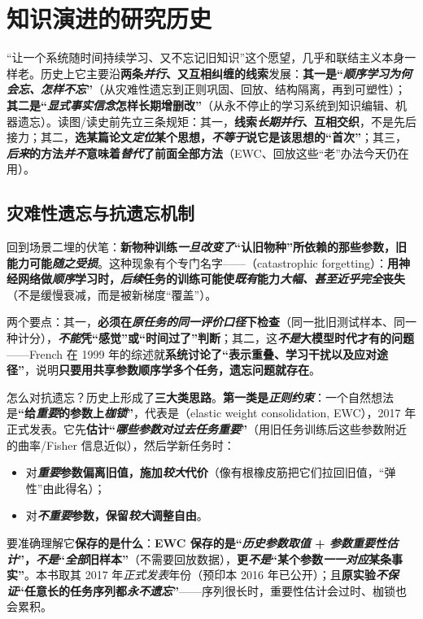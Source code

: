 \section{知识演进的研究历史}
\label{sec:ket-overview-history}

“让一个系统随时间持续学习、又不忘记旧知识”这个愿望，几乎和联结主义本身一样老。历史上它主要沿\textbf{两条\emph{并行}、又互相纠缠的线索}发展：\textbf{其一是“\emph{顺序学习为何会忘、怎样不忘}”}（从灾难性遗忘到正则巩固、回放、结构隔离，再到可塑性）；\textbf{其二是“\emph{显式事实信念}怎样长期增删改”}（从永不停止的学习系统到知识编辑、机器遗忘）。读图/读史前先立三条规矩：其一，\textbf{线索\emph{长期并行}、互相交织}，不是先后接力；其二，\textbf{选某篇论文\emph{定位}某个思想，\emph{不等于}说它是该思想的“首次”}；其三，\textbf{\emph{后来}的方法\emph{并不}意味着\emph{替代}了前面全部方法}（EWC、回放这些“老”办法今天仍在用）。

\subsection{灾难性遗忘与抗遗忘机制}
\label{sec:ket-overview-history-maintenance}

回到场景二埋的伏笔：\textbf{新物种训练\emph{一旦改变了}“认旧物种”所依赖的那些参数，旧能力可能\emph{随之受损}}。这种现象有个专门名字——（catastrophic forgetting）：\textbf{用神经网络做\emph{顺序}学习时，\emph{后续}任务的训练可能使\emph{既有}能力\emph{大幅、甚至近乎完全}丧失}（不是缓慢衰减，而是被新梯度“覆盖”）。

两个要点：其一，\textbf{必须在\emph{原任务的同一评价口径}下检查}（同一批旧测试样本、同一种计分），\textbf{\emph{不能}凭“感觉”或“时间过了”判断}；其二，这\textbf{\emph{不是}大模型时代才有的问题}——French 在 1999 年的综述就\textbf{系统讨论了“表示重叠、学习干扰以及应对途径”}，说明\textbf{只要用共享参数顺序学多个任务，遗忘问题就存在}。

怎么对抗遗忘？历史上形成了\textbf{三大类思路}。\textbf{第一类是\emph{正则约束}}：一个自然想法是\textbf{“给\emph{重要}的参数上\emph{枷锁}”}，代表是（elastic weight consolidation, EWC），2017 年正式发表。它先\textbf{估计“\emph{哪些参数对过去任务\emph{重要}}”}（用旧任务训练后这些参数附近的曲率/Fisher 信息近似），然后学新任务时：
\begin{itemize}\item 对\textbf{\emph{重要}参数偏离旧值，施加\emph{较大}代价}（像有根橡皮筋把它们拉回旧值，“弹性”由此得名）；\item 对\textbf{\emph{不重要}参数，保留\emph{较大}调整自由}。\end{itemize}
要准确理解它\textbf{保存的是什么}：\textbf{EWC 保存的是“\emph{历史参数取值} + \emph{参数重要性估计}”，\emph{不是}“\emph{全部}旧样本”}（不需要回放数据），\textbf{更\emph{不是}“某个参数\emph{一一对应}某条事实”}。本书取其 2017 年\emph{正式发表}年份（预印本 2016 年已公开）；且\textbf{原实验\emph{不保证}“任意长的任务序列都\emph{永不遗忘}”}——序列很长时，重要性估计会过时、枷锁也会累积。

